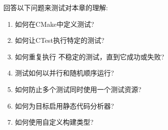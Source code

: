回答以下问题来测试对本章的理解:

\begin{enumerate}
\item 
如何在CMake中定义测试?

\item 
如何让CTest执行特定的测试?

\item 
如何重复执行 不稳定的测试，直到它成功或失败?

\item 
测试如何以并行和随机顺序运行?

\item 
如何防止多个测试同时使用一个测试资源?

\item 
如何为目标启用静态代码分析器?

\item 
如何使用自定义构建类型?
\end{enumerate}
